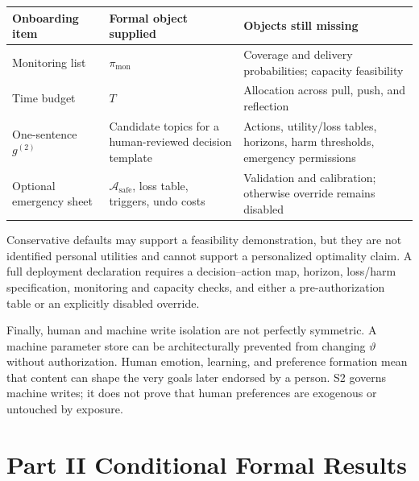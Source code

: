 \documentclass[
  11pt]{article}
\begin{document}
\begin{longtable}[]{@{}
  >{\raggedright\arraybackslash}p{}
  >{\raggedright\arraybackslash}p{}
  >{\raggedright\arraybackslash}p{}@{}}
\toprule\noalign{}
\begin{minipage}[b]{\linewidth}\raggedright
Onboarding item
\end{minipage} & \begin{minipage}[b]{\linewidth}\raggedright
Formal object supplied
\end{minipage} & \begin{minipage}[b]{\linewidth}\raggedright
Objects still missing
\end{minipage} \\
\midrule\noalign{}
\endhead
\bottomrule\noalign{}
\endlastfoot
Monitoring list & \(\pi_{\mathrm{mon}}\) & Coverage and delivery
probabilities; capacity feasibility \\
Time budget & \(T\) & Allocation across pull, push, and reflection \\
One-sentence \(g^{(2)}\) & Candidate topics for a human-reviewed
decision template & Actions, utility/loss tables, horizons, harm
thresholds, emergency permissions \\
Optional emergency sheet & \(\mathcal A_{\mathrm{safe}}\), loss table,
triggers, undo costs & Validation and calibration; otherwise override
remains disabled \\
\end{longtable}

Conservative defaults may support a feasibility demonstration, but they
are not identified personal utilities and cannot support a personalized
optimality claim. A full deployment declaration requires a
decision--action map, horizon, loss/harm specification, monitoring and
capacity checks, and either a pre-authorization table or an explicitly
disabled override.

Finally, human and machine write isolation are not perfectly symmetric.
A machine parameter store can be architecturally prevented from changing
\(\vartheta\) without authorization. Human emotion, learning, and
preference formation mean that content can shape the very goals later
endorsed by a person. S2 governs machine writes; it does not prove that
human preferences are exogenous or untouched by exposure.

\section{Part II Conditional Formal
Results}\label{part-ii-conditional-formal-results}
\end{document}
